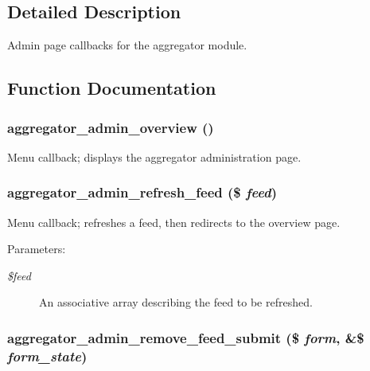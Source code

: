 \subsection{Detailed Description}
Admin page callbacks for the aggregator module. 

\subsection{Function Documentation}
\hypertarget{aggregator_8admin_8inc_9fe4f30b63dd656ba52c3af570556272}{
\subsubsection[{aggregator\_\-admin\_\-overview}]{\setlength{\rightskip}{0pt plus 5cm}aggregator\_\-admin\_\-overview ()}}
\label{aggregator_8admin_8inc_9fe4f30b63dd656ba52c3af570556272}


Menu callback; displays the aggregator administration page. \hypertarget{aggregator_8admin_8inc_eb33d62d98fcdc9c66379002613f497b}{
\subsubsection[{aggregator\_\-admin\_\-refresh\_\-feed}]{\setlength{\rightskip}{0pt plus 5cm}aggregator\_\-admin\_\-refresh\_\-feed (\$ {\em feed})}}
\label{aggregator_8admin_8inc_eb33d62d98fcdc9c66379002613f497b}


Menu callback; refreshes a feed, then redirects to the overview page.

\begin{Desc}
\item[Parameters:]
\begin{description}
\item[{\em \$feed}]An associative array describing the feed to be refreshed. \end{description}
\end{Desc}
\hypertarget{aggregator_8admin_8inc_6129f0a0c72d8e0ada1fb2f4cd40519d}{
\subsubsection[{aggregator\_\-admin\_\-remove\_\-feed\_\-submit}]{\setlength{\rightskip}{0pt plus 5cm}aggregator\_\-admin\_\-remove\_\-feed\_\-submit (\$ {\em form}, \/  \&\$ {\em form\_\-state})}}
\label{aggregator_8admin_8inc_6129f0a0c72d8e0ada1fb2f4cd40519d}


